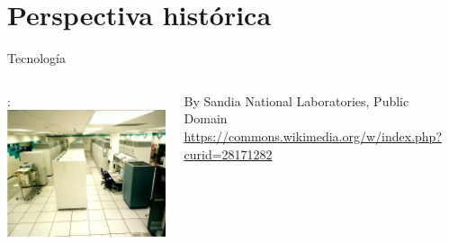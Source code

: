 \section{Perspectiva histórica}

\begin{frame}[t]{Tecnología}

\begin{columns}[T]

: \\
\includegraphics[height=.6\textheight]{images/asci-red.jpg}\\
\begin{tiny}
By Sandia National Laboratories, Public Domain\\
\url{https://commons.wikimedia.org/w/index.php?curid=28171282}\\
\end{tiny}

\\

\pause


\end{columns}
\end{frame}
